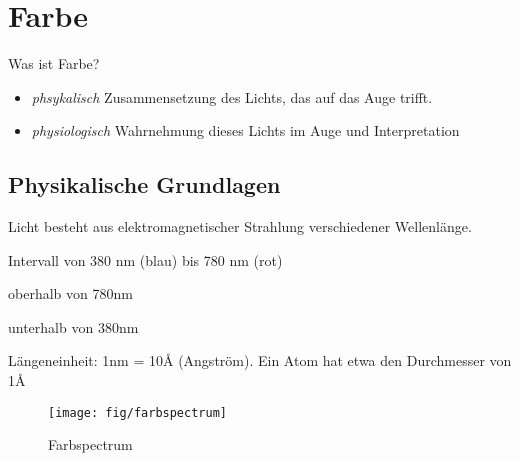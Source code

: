 \chapter{Farbe}
Was ist Farbe?
\begin{itemize}[labelindent=1cm]
  \item \textit{phsykalisch} Zusammensetzung des Lichts, das auf das Auge trifft.
  \item \textit{physiologisch} Wahrnehmung dieses Lichts im Auge und Interpretation
\end{itemize}


\section{Physikalische Grundlagen}
Licht besteht aus elektromagnetischer Strahlung verschiedener Wellenlänge.
\begin{description}[labelindent=1cm]
  \item[sichtbares Licht] Intervall von 380 nm (blau) bis 780 nm (rot)
  \item[infrarot] oberhalb von 780nm
  \item[ultraviolett] unterhalb von 380nm
\end{description}
Längeneinheit: 1nm = 10Å (Angström). Ein Atom hat etwa den Durchmesser von 1Å
\begin{figure}[!ht]
\centering
\texttt{[image: fig/farbspectrum]}
\caption{Farbspectrum}
\label{fig:farbspectrum}
\end{figure}

